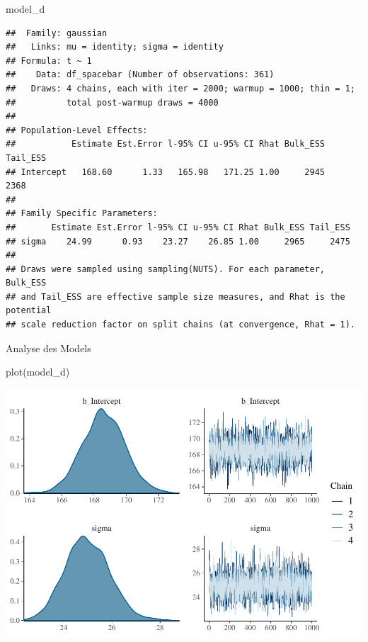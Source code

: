 \documentclass[
]{article}
\newenvironment{Shaded}{\begin{snugshade}}{\end{snugshade}}
\newcommand{\FunctionTok}[1]{\textcolor[rgb]{0.00,0.00,0.00}{#1}}
\newcommand{\NormalTok}[1]{#1}
\begin{document}
\begin{Shaded}
\begin{Highlighting}[]
\NormalTok{model\_d}
\end{Highlighting}
\end{Shaded}

\begin{verbatim}
##  Family: gaussian 
##   Links: mu = identity; sigma = identity 
## Formula: t ~ 1 
##    Data: df_spacebar (Number of observations: 361) 
##   Draws: 4 chains, each with iter = 2000; warmup = 1000; thin = 1;
##          total post-warmup draws = 4000
## 
## Population-Level Effects: 
##           Estimate Est.Error l-95% CI u-95% CI Rhat Bulk_ESS Tail_ESS
## Intercept   168.60      1.33   165.98   171.25 1.00     2945     2368
## 
## Family Specific Parameters: 
##       Estimate Est.Error l-95% CI u-95% CI Rhat Bulk_ESS Tail_ESS
## sigma    24.99      0.93    23.27    26.85 1.00     2965     2475
## 
## Draws were sampled using sampling(NUTS). For each parameter, Bulk_ESS
## and Tail_ESS are effective sample size measures, and Rhat is the potential
## scale reduction factor on split chains (at convergence, Rhat = 1).
\end{verbatim}

Analyse des Models

\begin{Shaded}
\begin{Highlighting}[]
\FunctionTok{plot}\NormalTok{(model\_d)}
\end{Highlighting}
\end{Shaded}

\includegraphics{Loesung-Zettel-2_files/figure-latex/unnamed-chunk-7-1.pdf}
\end{document}
